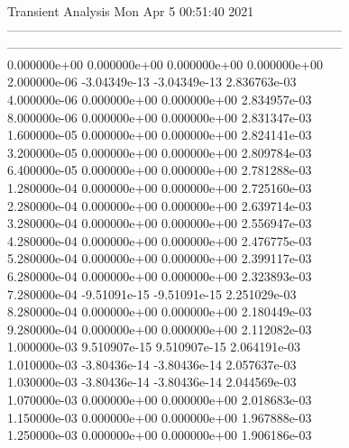                                    Transient Analysis  Mon Apr  5 00:51:40  2021\\ \hline
--------------------------------------------------------------------------------\\ \hline
--------------------------------------------------------------------------------\\ 	0.000000e+00	0.000000e+00	0.000000e+00	0.000000e+00	\\ 	2.000000e-06	-3.04349e-13	-3.04349e-13	2.836763e-03	\\ 	4.000000e-06	0.000000e+00	0.000000e+00	2.834957e-03	\\ 	8.000000e-06	0.000000e+00	0.000000e+00	2.831347e-03	\\ 	1.600000e-05	0.000000e+00	0.000000e+00	2.824141e-03	\\ 	3.200000e-05	0.000000e+00	0.000000e+00	2.809784e-03	\\ 	6.400000e-05	0.000000e+00	0.000000e+00	2.781288e-03	\\ 	1.280000e-04	0.000000e+00	0.000000e+00	2.725160e-03	\\ 	2.280000e-04	0.000000e+00	0.000000e+00	2.639714e-03	\\ 	3.280000e-04	0.000000e+00	0.000000e+00	2.556947e-03	\\ 	4.280000e-04	0.000000e+00	0.000000e+00	2.476775e-03	\\ 	5.280000e-04	0.000000e+00	0.000000e+00	2.399117e-03	\\ 	6.280000e-04	0.000000e+00	0.000000e+00	2.323893e-03	\\ 	7.280000e-04	-9.51091e-15	-9.51091e-15	2.251029e-03	\\ 	8.280000e-04	0.000000e+00	0.000000e+00	2.180449e-03	\\ 	9.280000e-04	0.000000e+00	0.000000e+00	2.112082e-03	\\ 	1.000000e-03	9.510907e-15	9.510907e-15	2.064191e-03	\\ 	1.010000e-03	-3.80436e-14	-3.80436e-14	2.057637e-03	\\ 	1.030000e-03	-3.80436e-14	-3.80436e-14	2.044569e-03	\\ 	1.070000e-03	0.000000e+00	0.000000e+00	2.018683e-03	\\ 	1.150000e-03	0.000000e+00	0.000000e+00	1.967888e-03	\\ 	1.250000e-03	0.000000e+00	0.000000e+00	1.906186e-03	\\ \hline
